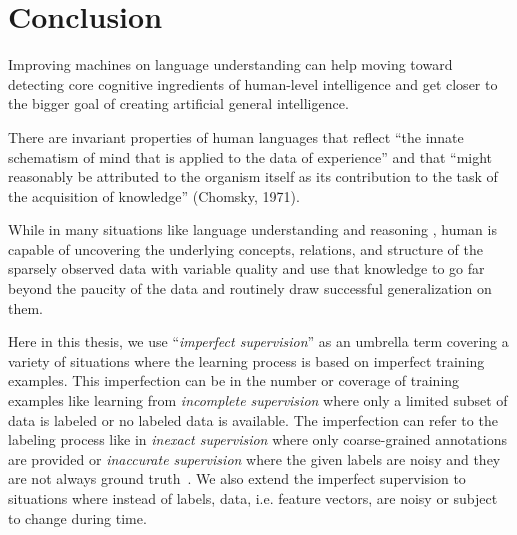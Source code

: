 \chapter{Conclusion}

Improving machines on language understanding can help moving toward detecting core cognitive ingredients of human-level intelligence and get closer to the bigger goal of creating artificial general intelligence.


There are invariant properties of human languages that reflect ``the innate schematism of mind that is applied to the data of experience'' and that ``might reasonably be attributed to the organism itself as its contribution to the task of the acquisition of knowledge'' (Chomsky, 1971).

While in many situations like language understanding and reasoning , human is capable of uncovering the underlying concepts, relations, and structure of the sparsely observed data with variable quality and use that knowledge to go far beyond the paucity of the data and routinely draw successful generalization on them.


Here in this thesis, we use ``\emph{imperfect supervision}'' as an umbrella term covering a variety of situations where the learning process is based on imperfect training examples. This imperfection can be in the number or coverage of training examples like learning from \emph{incomplete supervision} where only a limited subset of data is labeled or no labeled data is available. The imperfection can refer to the labeling process like in \emph{inexact supervision} where only coarse-grained annotations are provided or \emph{inaccurate supervision} where the given labels are noisy and they are not always ground truth~\citep{zhou2018brief}. We also extend the imperfect supervision to situations where instead of labels, data, i.e. feature vectors, are noisy or subject to change during time.


